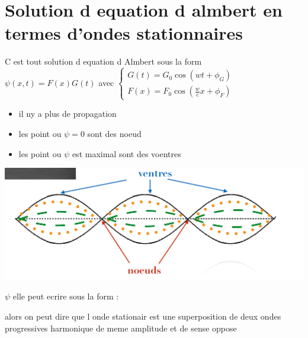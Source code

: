 \documentclass[12pt]{book}
\begin{document}
        \section{Solution d equation d almbert en termes d'ondes stationnaires}
            C est tout solution d equation d Almbert sous la form \\ $\psi(x,t)=F(x)G(t)$ 
            avec $\begin{cases}
                G(t)=G_0\cos(wt+\phi_G)\\
                F(x)=F_0\cos(\frac{w}{c}x+\phi_F)
            \end{cases}$ \\
            \begin{center}
            \end{center}
            \begin{center}
                \begin{minipage}{0,49\linewidth}
                    \begin{itemize}
                        \item il ny a plus de propagation 
                        \item les point ou $\psi =0$ sont des noeud
                        \item les point ou $\psi $ est maximal sont des voentres
                    \end{itemize}
                \end{minipage}
                \begin{minipage}{0,49\linewidth}
                    \includegraphics[width=\linewidth]{pic/stationair.png}
                \end{minipage}
            \end{center}
            $\psi  $ elle peut ecrire sous la form : 
            \begin{center}
            \end{center}
            alors on peut dire que l onde stationair est une superposition de deux ondes progressives harmonique de meme amplitude et de sense oppose
\end{document}
